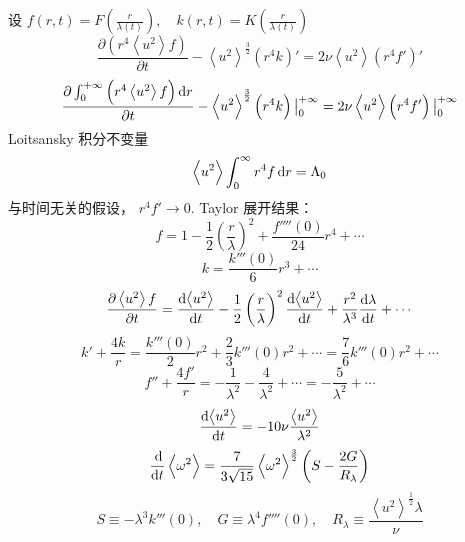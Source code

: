 \documentclass[12pt]{ctexart}
\begin{document}
设 $f(r,t) = F\left( \frac{r}{\lambda(t)} \right) ,\quad k(r,t) = K\left( \frac{r}{\lambda (t)} \right) $
\begin{equation}
   \frac{\partial \left( r^4 \left<	u^2 \right> f \right) }{\partial t}  - \left< u^2 \right> ^{\frac{3}{2}} \left(r^4 k\right)' = 2 \nu \left< u^2 \right> \left(r^4f'\right)'
\end{equation}
\begin{equation}
   \frac{\partial \int_{0}^{+\infty}\left( r^4 \left<	u^2 \right> f \right) \dif r }{\partial t}  - \left< u^2 \right> ^{\frac{3}{2}} \left(r^4 k\right)  \big|_{0}^{+\infty} = 2 \nu \left< u^2 \right> \left(r^4f'\right)\big|_{0}^{+\infty}
\end{equation}
Loitsansky 积分不变量
\begin{equation}
   \left< u^2 \right> \int_{0}^{\infty} r^4 f \dif r = \Lambda_0
\end{equation}
与时间无关的假设， $r^4 f' \to 0$.
Taylor 展开结果：
\begin{equation}
   f = 1 - \frac{1}{2} \left( \frac{r}{\lambda} \right)^2 + \frac{f''''(0)}{24}r^4 + \cdots
\end{equation}
\begin{equation}
   k = \frac{k'''(0)}{6}r^3 + \cdots
\end{equation}
\begin{equation}
   \frac{\partial \left< u^2 \right>f}{\partial t}  = \frac{\dif \left< u^2 \right>}{\dif t} - \frac{1}{2} \left( \frac{r}{\lambda} \right)^2 \frac{\dif \left< u^2 \right>}{\dif t} + \frac{r^2}{\lambda^3} \frac{\dif \lambda}{\dif t} + \cdots
\end{equation}
\begin{equation}
   k' + \frac{4k}{r} =  \frac{k'''(0)}{2} r^2 + \frac{2}{3}k'''(0) r^2 + \cdots = \frac{7}{6} k'''(0) r^2 + \cdots
\end{equation}
\begin{equation}
   f'' + \frac{4f'}{r} = - \frac{1}{\lambda^2} - \frac{4}{\lambda^2} + \cdots = -\frac{5}{\lambda^2} + \cdots
\end{equation}
\begin{equation}
   \frac{\dif \left< u^2 \right>}{\dif t} = -10 \nu \frac{\left< u^2 \right>}{\lambda^2}
\end{equation}
\begin{equation}
   \frac{\dif }{\dif t} \left< \omega^2 \right> = \frac{7}{3\sqrt{15}} \left< \omega^2 \right>^{\frac{3}{2}} \left( S - \frac{2G}{R_{\lambda}} \right) 
\end{equation}
\begin{equation}
   S \equiv - \lambda^3 k'''(0),\quad G \equiv \lambda^4 f''''(0),\quad R_{\lambda} \equiv \frac{\left< u^2 \right>^{\frac{1}{2}}\lambda}{\nu}
\end{equation}
\end{document}

